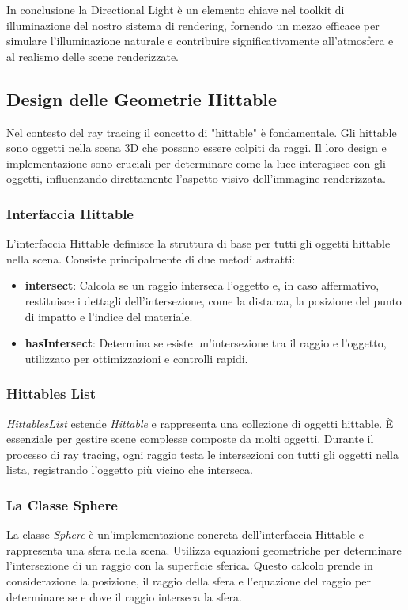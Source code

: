 \documentclass[12pt]{article}
\begin{document}
In conclusione la Directional Light è un elemento chiave nel toolkit di illuminazione del nostro sistema di rendering, fornendo un mezzo efficace per simulare l'illuminazione naturale e contribuire significativamente all'atmosfera e al realismo delle scene renderizzate.

\subsection{Design delle Geometrie Hittable}
Nel contesto del ray tracing il concetto di "hittable" è fondamentale. Gli hittable sono oggetti nella scena 3D che possono essere colpiti da raggi. Il loro design e implementazione sono cruciali per determinare come la luce interagisce con gli oggetti, influenzando direttamente l'aspetto visivo dell'immagine renderizzata.

\subsubsection{Interfaccia Hittable}
L'interfaccia Hittable definisce la struttura di base per tutti gli oggetti hittable nella scena. Consiste principalmente di due metodi astratti:
\begin{itemize}
\item \textbf{intersect}: Calcola se un raggio interseca l'oggetto e, in caso affermativo, restituisce i dettagli dell'intersezione, come la distanza, la posizione del punto di impatto e l'indice del materiale.
\item \textbf{hasIntersect}: Determina se esiste un'intersezione tra il raggio e l'oggetto, utilizzato per ottimizzazioni e controlli rapidi.
\end{itemize}

\subsubsection{Hittables List}
\textit{HittablesList} estende \textit{Hittable} e rappresenta una collezione di oggetti hittable. È essenziale per gestire scene complesse composte da molti oggetti. Durante il processo di ray tracing, ogni raggio testa le intersezioni con tutti gli oggetti nella lista, registrando l'oggetto più vicino che interseca.

\subsubsection{La Classe Sphere}
La classe \textit{Sphere} è un'implementazione concreta dell'interfaccia Hittable e rappresenta una sfera nella scena. Utilizza equazioni geometriche per determinare l'intersezione di un raggio con la superficie sferica. Questo calcolo prende in considerazione la posizione, il raggio della sfera e l'equazione del raggio per determinare se e dove il raggio interseca la sfera.
\end{document}
